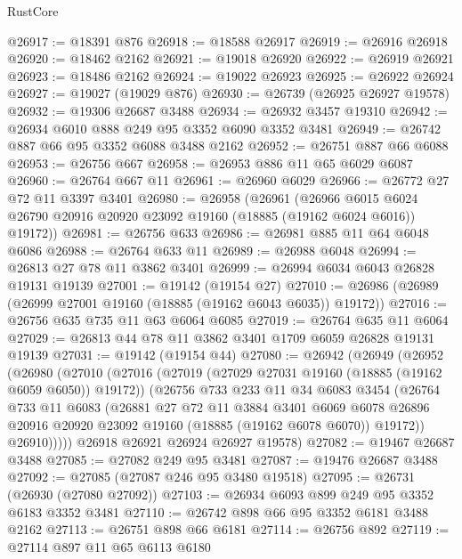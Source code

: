 \begin{lexlean}{RustCore}
\begin{coremodule}
@26917 := @18391 @876
@26918 := @18588 @26917
@26919 := @26916 @26918
@26920 := @18462 @2162
@26921 := @19018 @26920
@26922 := @26919 @26921
@26923 := @18486 @2162
@26924 := @19022 @26923
@26925 := @26922 @26924
@26927 := @19027 (@19029 @876)
@26930 := @26739 (@26925 @26927 @19578)
@26932 := @19306 @26687 @3488
@26934 := @26932 @3457 @19310
@26942 := @26934 @6010 @888 @249 @95 @3352 @6090 @3352 @3481
@26949 := @26742 @887 @66 @95 @3352 @6088 @3488 @2162
@26952 := @26751 @887 @66 @6088
@26953 := @26756 @667
@26958 := @26953 @886 @11 @65 @6029 @6087
@26960 := @26764 @667 @11
@26961 := @26960 @6029
@26966 := @26772 @27 @72 @11 @3397 @3401
@26980 := @26958
    (@26961
      (@26966 @6015 @6024 @26790 @20916 @20920 @23092 @19160 (@18885 (@19162 @6024 @6016)) @19172))
@26981 := @26756 @633
@26986 := @26981 @885 @11 @64 @6048 @6086
@26988 := @26764 @633 @11
@26989 := @26988 @6048
@26994 := @26813 @27 @78 @11 @3862 @3401
@26999 := @26994 @6034 @6043 @26828 @19131 @19139
@27001 := @19142 (@19154 @27)
@27010 := @26986 (@26989 (@26999 @27001 @19160 (@18885 (@19162 @6043 @6035)) @19172))
@27016 := @26756 @635 @735 @11 @63 @6064 @6085
@27019 := @26764 @635 @11 @6064
@27029 := @26813 @44 @78 @11 @3862 @3401 @1709 @6059 @26828 @19131 @19139
@27031 := @19142 (@19154 @44)
@27080 := @26942
    (@26949
      (@26952
        (@26980
          (@27010
            (@27016
              (@27019 (@27029 @27031 @19160 (@18885 (@19162 @6059 @6050)) @19172))
              (@26756
                @733
                @233
                @11
                @34
                @6083
                @3454
                (@26764
                  @733
                  @11
                  @6083
                  (@26881
                    @27
                    @72
                    @11
                    @3884
                    @3401
                    @6069
                    @6078
                    @26896
                    @20916
                    @20920
                    @23092
                    @19160
                    (@18885 (@19162 @6078 @6070))
                    @19172))
                @26910)))))
      @26918
      @26921
      @26924
      @26927
      @19578)
@27082 := @19467 @26687 @3488
@27085 := @27082 @249 @95 @3481
@27087 := @19476 @26687 @3488
@27092 := @27085 (@27087 @246 @95 @3480 @19518)
@27095 := @26731 (@26930 (@27080 @27092))
@27103 := @26934 @6093 @899 @249 @95 @3352 @6183 @3352 @3481
@27110 := @26742 @898 @66 @95 @3352 @6181 @3488 @2162
@27113 := @26751 @898 @66 @6181
@27114 := @26756 @892
@27119 := @27114 @897 @11 @65 @6113 @6180

\end{coremodule}
\end{lexlean}

